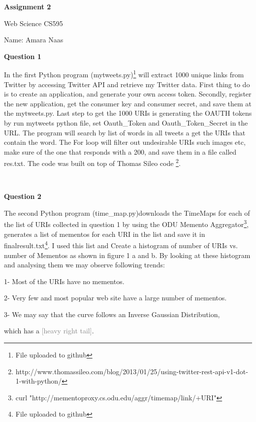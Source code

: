 \documentclass[a4paper,12pt]{article}
\begin{document}
\begin{center}
\begin{Large}


\textbf{Assignment 2}

Web Science CS595

Name: Amara Naas
\end{Large}
\end{center}
\pagebreak

\textbf{Question 1}\par
In the first Python program (mytweets.py)\footnote{File uploaded to github} will extract 1000 unique links from Twitter by accessing Twitter API and retrieve my Twitter data. First thing to do is to create an application, and generate your own access token. Secondly, register the new application, get the consumer key and consumer secret, and save them at the mytweets.py\footnotemark[\value{footnote}]. Last step to get the 1000 URIs is generating the OAUTH tokens by run mytweets python file, set Oauth\_Token and Oauth\_Token\_Secret in the URL.
The program will search by list of words in all tweets a get the URIs that contain the word. The For loop will filter out undesirable URIs such images etc, make sure of the one that responds with a 200, and save them in a file called res.txt\footnotemark[\value{footnote}].
The code was built on top of Thomas Sileo code \footnote{http://www.thomassileo.com/blog/2013/01/25/using-twitter-rest-api-v1-dot-1-with-python/}.\par

$\:$

\textbf{Question 2}\par
The second Python program (time\_map.py)\footnotemark[1] downloads the TimeMaps for each of the list of URIs collected in question 1 by using the ODU Memento Aggregator\footnote{curl "http://mementoproxy.cs.odu.edu/aggr/timemap/link/+URI"}, generates a list of mementos for each URI in the list and save it in finalresult.txt\footnote{File uploaded to github}.
I used this list and Create a histogram of number of URIs vs. number of Mementos as shown in figure 1 a and b. By looking at these histogram and analysing them we may observe following trends:\par
1- Most of the URIs have no mementos.\par
2- Very few and most popular web site have a large number of mementos.\par
3- We may say that the curve follows an Inverse Gaussian Distribution,\par which has a \textcolor{gray}{[heavy right tail]}.
\end{document}
